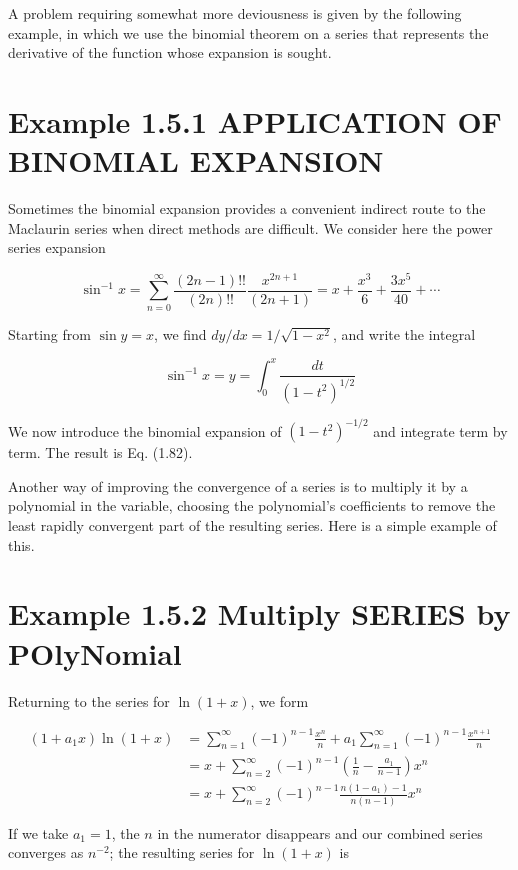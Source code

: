 \documentclass[10pt]{article}
\begin{document}
A problem requiring somewhat more deviousness is given by the following example, in which we use the binomial theorem on a series that represents the derivative of the function whose expansion is sought.

\section*{Example 1.5.1 APPLICATION OF BINOMIAL EXPANSION}
Sometimes the binomial expansion provides a convenient indirect route to the Maclaurin series when direct methods are difficult. We consider here the power series expansion


\begin{equation*}
\sin ^{-1} x=\sum_{n=0}^{\infty} \frac{(2 n-1)!!}{(2 n)!!} \frac{x^{2 n+1}}{(2 n+1)}=x+\frac{x^{3}}{6}+\frac{3 x^{5}}{40}+\cdots \tag{1.82}
\end{equation*}


Starting from $\sin y=x$, we find $d y / d x=1 / \sqrt{1-x^{2}}$, and write the integral

$$
\sin ^{-1} x=y=\int_{0}^{x} \frac{d t}{\left(1-t^{2}\right)^{1 / 2}}
$$

We now introduce the binomial expansion of $\left(1-t^{2}\right)^{-1 / 2}$ and integrate term by term. The result is Eq. (1.82).

Another way of improving the convergence of a series is to multiply it by a polynomial in the variable, choosing the polynomial's coefficients to remove the least rapidly convergent part of the resulting series. Here is a simple example of this.

\section*{Example 1.5.2 Multiply SERIES by POlyNomial}
Returning to the series for $\ln (1+x)$, we form

$$
\begin{aligned}
\left(1+a_{1} x\right) \ln (1+x) & =\sum_{n=1}^{\infty}(-1)^{n-1} \frac{x^{n}}{n}+a_{1} \sum_{n=1}^{\infty}(-1)^{n-1} \frac{x^{n+1}}{n} \\
& =x+\sum_{n=2}^{\infty}(-1)^{n-1}\left(\frac{1}{n}-\frac{a_{1}}{n-1}\right) x^{n} \\
& =x+\sum_{n=2}^{\infty}(-1)^{n-1} \frac{n\left(1-a_{1}\right)-1}{n(n-1)} x^{n}
\end{aligned}
$$

If we take $a_{1}=1$, the $n$ in the numerator disappears and our combined series converges as $n^{-2}$; the resulting series for $\ln (1+x)$ is
\end{document}
